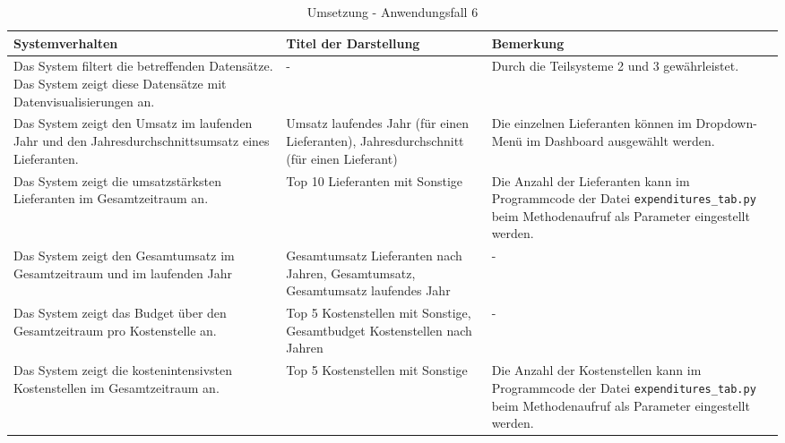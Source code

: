 \begingroup
    \setlength{\tabcolsep}{12pt} %
    \renewcommand{\arraystretch}{1.5} 
    \begin{table}[h]
        \centering
        \Large
        \begin{adjustbox}{max width=\textwidth}
        \begin{tabular}{p{}p{}p{}}
           \toprule
           Systemverhalten        &Titel der Darstellung&Bemerkung\\
           \midrule
           Das System filtert die betreffenden Datensätze. Das System zeigt diese Datensätze mit Datenvisualisierungen an.&-&Durch die Teilsysteme 2 und 3 gewährleistet.\\
           Das System zeigt den Umsatz im laufenden Jahr und den Jahresdurchschnittsumsatz eines Lieferanten.&Umsatz laufendes Jahr (für einen Lieferanten), Jahresdurchschnitt (für einen Lieferant)&Die einzelnen Lieferanten können im Dropdown-Menü im Dashboard ausgewählt werden.\\
           Das System zeigt die umsatzstärksten Lieferanten im Gesamtzeitraum an.&Top 10 Lieferanten mit Sonstige  &Die Anzahl der Lieferanten kann im Programmcode der Datei \texttt{expenditures\_tab.py} beim Methodenaufruf als Parameter eingestellt werden.\\
           Das System zeigt den Gesamtumsatz im Gesamtzeitraum und im laufenden Jahr&Gesamtumsatz Lieferanten nach Jahren, Gesamtumsatz, Gesamtumsatz laufendes Jahr&-\\
           Das System zeigt das Budget über den Gesamtzeitraum pro Kostenstelle an.&Top 5 Kostenstellen mit Sonstige, Gesamtbudget Kostenstellen nach Jahren&-\\
           Das System zeigt die kostenintensivsten Kostenstellen im Gesamtzeitraum an.&Top 5 Kostenstellen mit Sonstige&Die Anzahl der Kostenstellen kann im Programmcode der Datei \texttt{expenditures\_tab.py} beim Methodenaufruf als Parameter eingestellt werden.\\
        \bottomrule
        \end{tabular}
        \end{adjustbox}
        \caption{%
            Umsetzung - Anwendungsfall 6
        }
        \label{tab:Anwendungsfall 6 - Umgesetzte Anforderungen}
        \end{table}
\endgroup
\clearpage
